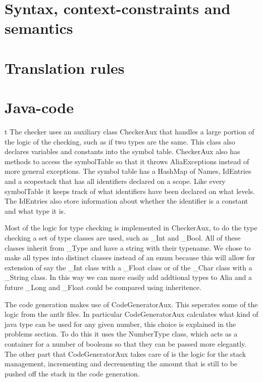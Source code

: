 \documentclass[paper=a4, fontsize=11pt]{report}
\numberwithin{equation}{section}		%
\numberwithin{figure}{section}			%
\numberwithin{table}{section}				%
\begin{document}
\chapter{Syntax, context-constraints and semantics}


\chapter{Translation rules} %

\chapter{Java-code}t
The checker uses an auxiliary class CheckerAux that handles a large portion of the logic of the checking, such as if two types are the same. This class also declares variables and constants into the symbol table. CheckerAux also has methods to access the symbolTable so that it throws AliaExceptions instead of more general exceptions. The symbol table has a HashMap of Names, IdEntries and a scopestack that has all identifiers declared on a scope. Like every symbolTable it keeps track of what identifiers have been declared on what levels. The IdEntries also store information about whether the identifier is a constant and what type it is.

Most of the logic for type checking is implemented in CheckerAux, to do the type checking a set of type classes are used, such as \_Int and \_Bool. All of these classes inherit from \_Type and have a string with their typename. We chose to make all types into distinct classes instead of an enum because this will allow for extension of say the \_Int class with a \_Float class or of the \_Char class with a \_String class. In this way we can more easily add addtional types to Alia and a future \_Long and \_Float could be compared using inheritence.

The code generation makes use of CodeGeneratorAux. This seperates some of the logic from the antlr files. In particular CodeGeneratorAux calculates what kind of java type can be used for any given number, this choice is explained in the problems section. To do this it uses the NumberType class, which acts as a container for a number of booleans so that they can be passed more elegantly. The other part that CodeGeneratorAux takes care of is the logic for the stack management, incrementing and decrementing the amount that is still to be pushed off the stack in the code generation.
\end{document}
